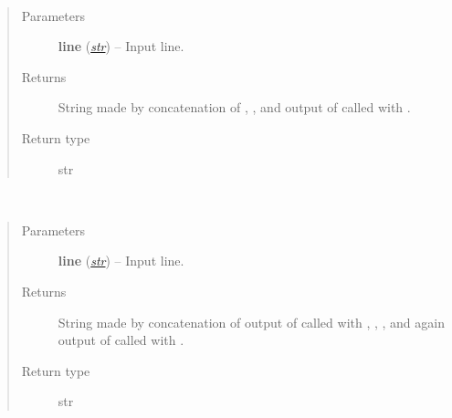 \documentclass[a4paper,10pt,english]{sphinxmanual}
\begin{document}

\begin{fulllineitems}
\label{aqueduct.utils.log:aqueduct.utils.log.underline}~\begin{quote}\begin{description}
\item[{Parameters}] \leavevmode
\textbf{line} (\href{http://docs.python.org/2/library/functions.html\#str}{\emph{str}}) -- Input line.

\item[{Returns}] \leavevmode
String made by concatenation of , , and output of {\hyperref[aqueduct.utils.log:aqueduct.utils.log.tsep]{}} called with .

\item[{Return type}] \leavevmode
str

\end{description}\end{quote}

\end{fulllineitems}


\begin{fulllineitems}
\label{aqueduct.utils.log:aqueduct.utils.log.thead}~\begin{quote}\begin{description}
\item[{Parameters}] \leavevmode
\textbf{line} (\href{http://docs.python.org/2/library/functions.html\#str}{\emph{str}}) -- Input line.

\item[{Returns}] \leavevmode
String made by concatenation of output of {\hyperref[aqueduct.utils.log:aqueduct.utils.log.tsep]{}} called with , , , and again output of {\hyperref[aqueduct.utils.log:aqueduct.utils.log.tsep]{}} called with .

\item[{Return type}] \leavevmode
str

\end{description}\end{quote}

\end{fulllineitems}
\end{document}
